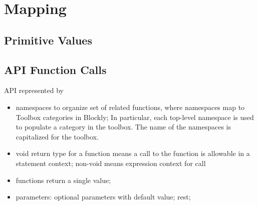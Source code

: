 


\section{Mapping}

\subsection{Primitive Values}



\subsection{API Function Calls}

API represented by
\begin{itemize}
  \item namespaces to organize set of related functions, 
       where namespaces map to Toolbox categories in Blockly;
       In particular, each top-level namespace is used to populate a category 
       in the toolbox. The name of the namespaces is capitalized for the toolbox. 

  \item void return type for a function means a call to the function is allowable in
      a statement context; non-void means expression context for call
  \item functions return a single value;
  \item parameters: optional parameters with default value; rest; 
\end{itemize}




